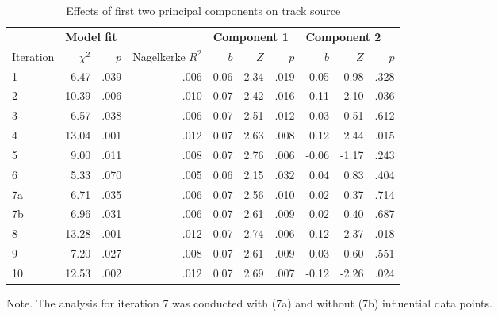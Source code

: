 \begin{table}[ht]
\centering
\small

\begin{threeparttable}
\caption{Effects of first two principal components on track source}
\label{tab:val-6}

\begin{tabular*}{\textwidth}{@{\extracolsep{\fill}}lrrrrrrrrr@{}}

\toprule & 
\multicolumn{3}{l}{\textbf{Model fit}} & \multicolumn{3}{l}{\textbf{Component 1}} & \multicolumn{3}{l}{\textbf{Component 2}} \\
\cmidrule{2-10}

Iteration & $\chi^2$   & $p$   & Nagelkerke $R^2$  & $b$          & $Z$         & $p$         & $b$          & $Z$         & $p$         \\ 
\midrule

1  & 6.47  & .039 & .006 & 0.06 & 2.34 & .019 & 0.05  & 0.98  & .328 \\
2  & 10.39 & .006 & .010 & 0.07 & 2.42 & .016 & -0.11 & -2.10 & .036 \\
3  & 6.57  & .038 & .006 & 0.07 & 2.51 & .012 & 0.03  & 0.51  & .612 \\
4  & 13.04 & .001 & .012 & 0.07 & 2.63 & .008 & 0.12  & 2.44  & .015 \\
5  & 9.00  & .011 & .008 & 0.07 & 2.76 & .006 & -0.06 & -1.17 & .243 \\
6  & 5.33  & .070 & .005 & 0.06 & 2.15 & .032 & 0.04  & 0.83  & .404 \\
7a & 6.71  & .035 & .006 & 0.07 & 2.56 & .010 & 0.02  & 0.37  & .714 \\
7b & 6.96  & .031 & .006 & 0.07 & 2.61 & .009 & 0.02  & 0.40  & .687 \\
8  & 13.28 & .001 & .012 & 0.07 & 2.74 & .006 & -0.12 & -2.37 & .018 \\
9  & 7.20  & .027 & .008 & 0.07 & 2.61 & .009 & 0.03  & 0.60  & .551 \\
10 & 12.53 & .002 & .012 & 0.07 & 2.69 & .007 & -0.12 & -2.26 & .024 \\
\bottomrule

\end{tabular*}
\begin{tablenotes}
\small
\item Note. The analysis for iteration 7 was conducted with (7a) and without (7b) influential data points.
\end{tablenotes}
\end{threeparttable}
\end{table}